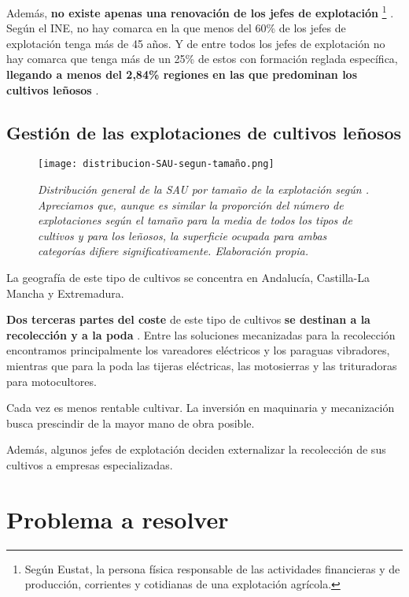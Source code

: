 Además, \textbf{no existe apenas una renovación de los jefes de explotación}%
\footnote{%
    Según Eustat, la persona física responsable de las actividades financieras y de producción, corrientes y cotidianas de una explotación agrícola.
}%
. Según el INE, no hay comarca en la que menos del 60\% de los jefes de explotación tenga más de 45 años.
Y de entre todos los jefes de explotación no hay comarca que tenga más de un 25\% de estos con formación
reglada específica, \textbf{llegando a menos del 2,84\% regiones en las que predominan los cultivos leñosos}
 \cite[Formación de los jefes de explotación]{INEpanoramicaCensoAgrario}.

\subsection{Gestión de las explotaciones de cultivos leñosos}

\begin{figure}[!b]
    \centering
    \texttt{[image: distribucion-SAU-segun-tamaño.png]}
    \caption{\textit{Distribución general de la SAU por tamaño de la explotación según
    \cite{INEdistribucionDeLaSuperficiePorTamaño}. Apreciamos que, aunque es similar la
    proporción del número de explotaciones según el tamaño para la media de todos los tipos
    de cultivos y para los leñosos, la superficie ocupada para ambas categorías difiere
    significativamente. Elaboración propia.}}
\end{figure}

La geografía de este tipo de cultivos se concentra en Andalucía, Castilla-La Mancha y Extremadura.
 \cite[Reparto de la superficie dedicada a los grandes cultivos.]{INEpanoramicaCensoAgrario}

\textbf{Dos terceras partes del coste} de este tipo de cultivos \textbf{se destinan a la
recolección y a la poda}
 \cite{Mecaolivar}.
Entre las soluciones mecanizadas para la recolección encontramos principalmente
los vareadores eléctricos y los paraguas vibradores,
mientras que para la poda las tijeras eléctricas, las motosierras y
las trituradoras para motocultores.

Cada vez es menos rentable cultivar. La inversión en maquinaria y mecanización
busca prescindir de la mayor mano de obra posible.

Además, algunos jefes de explotación deciden externalizar la recolección
de sus cultivos a empresas especializadas.

\section{Problema a resolver} \label{sec:problema_a_resolver}

